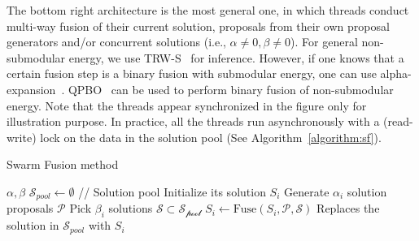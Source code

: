 %
The bottom right architecture is the most general one, in which
threads conduct multi-way fusion of their current solution, proposals
from their own proposal generators and/or concurrent solutions (i.e.,
$\alpha\ne 0, \beta \ne 0$).
%
For general non-submodular energy, we use TRW-S~\cite{TRW-S, opengm} for inference.
%
However, if one knows that a certain fusion step is a binary fusion with
submodular energy, one can use
alpha-expansion~\cite{alpha_expansion}.
%
%
QPBO~\cite{QPBO} can be used to perform binary fusion of non-submodular energy.
Note that the threads appear synchronized in the figure only for
illustration purpose. In practice, all the threads run asynchronously
with a (read-write) lock on the data in the solution pool (See
Algorithm~\ref{algorithm:sf}).
%
%
%
\begin{algorithm}
 \caption{Swarm Fusion method}
 \label{algorithm:sf}
 \begin{algorithmic}
  \Procedure{} {$\alpha, \beta$}
  \State $\mathcal{S}_{pool} \leftarrow \emptyset$ //
  Solution pool
  \State Initialize its solution $S_i$
  \EndFor
  \State
  \State Generate $\alpha_i$ solution proposals $\mathcal{P}$ %
  \State Pick $\beta_i$ solutions $\mathcal{S} \subset \mathcal{S_{\mbox{pool}}}$
  \State $S_i \leftarrow \mbox{Fuse}(S_i, \mathcal{P}, \mathcal{S})$
  \State Replaces the solution in $\mathcal{S}_{pool}$ with $S_i$
  \EndFor
  \EndProcedure
 \end{algorithmic}
\end{algorithm}



